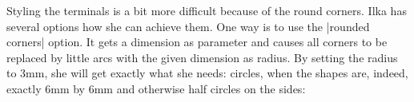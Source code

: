 Styling the terminals is a bit more difficult because of the round corners.
Ilka has several options how she can achieve them. One way is to use the
|rounded corners| option. It gets a dimension as parameter and causes all
corners to be replaced by little arcs with the given dimension as radius. By
setting the radius to 3mm, she will get exactly what she needs: circles, when
the shapes are, indeed, exactly 6mm by 6mm and otherwise half circles on the
sides:
%
\begin{codeexample}[preamble={\usetikzlibrary{positioning}}]
\end{codeexample}


